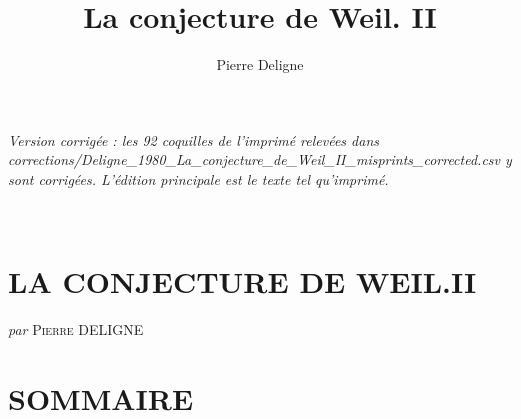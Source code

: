 \documentclass[11pt,leqno]{article}
\title{La conjecture de Weil. II}
\author{Pierre Deligne}
\date{}
\newcommand{\Page}[1]{\ifvmode\noindent\else\unskip\ \fi{\footnotesize\textcolor{gray}{[p.\,#1]}}\ \ignorespaces}
\begin{document}
\begin{center}\small\itshape Version corrigée : les 92 coquilles de l'imprimé relevées dans corrections/Deligne\_1980\_La\_conjecture\_de\_Weil\_II\_misprints\_corrected.csv y sont corrigées. L'édition principale est le texte tel qu'imprimé.\end{center}

\maketitle
\Page{137}
\section*{\centering\normalfont LA CONJECTURE DE WEIL.II}

\begin{center}
\textit{par} \textsc{Pierre} DELIGNE
\end{center}

\section*{\centering\normalfont\normalsize SOMMAIRE}
\end{document}
